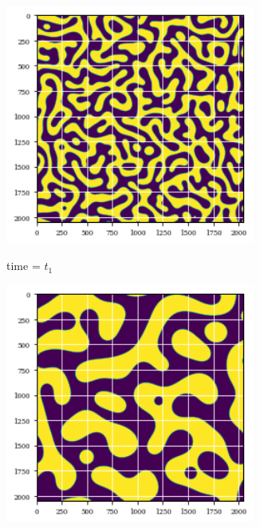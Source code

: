 \documentclass[12pt, a4paper]{report}
\begin{document}
\begin{figure}[H]
\centering
\begin{subfigure}{.32\textwidth}
  \centering
  \includegraphics[width=0.9\textwidth]{Pictures/MSFeatures/ConvexMicroEvolStart.png}
  \label{img:microstrImg}
  \caption{time = $t_1$}
\end{subfigure}
\begin{subfigure}{.32\textwidth}
  \centering
  \includegraphics[width=0.9\textwidth]{Pictures/MSFeatures/ConvexMicroExalMiddle.png}

\end{subfigure}
\end{figure}
\end{document}
